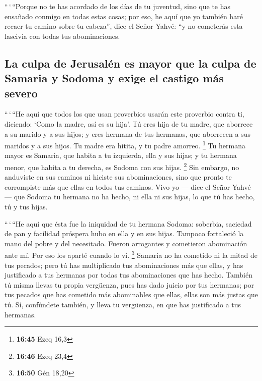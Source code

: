  ``\,`\,``Porque no te has acordado de los días de tu
juventud, sino que te has ensañado conmigo en todas estas cosas; por
eso, he aquí que yo también haré recaer tu camino sobre tu cabeza'',
dice el Señor Yahvé: ``y no cometerás esta lascivia con todas tus
abominaciones.

\hypertarget{la-culpa-de-jerusaluxe9n-es-mayor-que-la-culpa-de-samaria-y-sodoma-y-exige-el-castigo-muxe1s-severo}{%
\subsection{La culpa de Jerusalén es mayor que la culpa de Samaria y
Sodoma y exige el castigo más
severo}\label{la-culpa-de-jerusaluxe9n-es-mayor-que-la-culpa-de-samaria-y-sodoma-y-exige-el-castigo-muxe1s-severo}}

 ``\,`\,``He aquí que todos los que usan proverbios
usarán este proverbio contra ti, diciendo: `Como la madre, así es su
hija'.  Tú eres hija de tu madre, que aborrece a su
marido y a sus hijos; y eres hermana de tus hermanas, que aborrecen a
sus maridos y a sus hijos. Tu madre era hitita, y tu padre amorreo.
\footnote{\textbf{16:45} Ezeq 16,3}  Tu hermana mayor es
Samaria, que habita a tu izquierda, ella y sus hijas; y tu hermana
menor, que habita a tu derecha, es Sodoma con sus hijas. \footnote{\textbf{16:46}
  Ezeq 23,4}  Sin embargo, no anduviste en sus caminos ni
hiciste sus abominaciones, sino que pronto te corrompiste más que ellas
en todos tus caminos.  Vivo yo --- dice el Señor Yahvé
--- que Sodoma tu hermana no ha hecho, ni ella ni sus hijas, lo que tú
has hecho, tú y tus hijas.

 ``\,`\,``He aquí que ésta fue la iniquidad de tu hermana
Sodoma: soberbia, saciedad de pan y facilidad próspera hubo en ella y en
sus hijas. Tampoco fortaleció la mano del pobre y del necesitado.
 Fueron arrogantes y cometieron abominación ante mí. Por
eso los aparté cuando lo vi. \footnote{\textbf{16:50} Gén 18,20}
 Samaria no ha cometido ni la mitad de tus pecados; pero
tú has multiplicado tus abominaciones más que ellas, y has justificado a
tus hermanas por todas tus abominaciones que has hecho. 
También tú misma llevas tu propia vergüenza, pues has dado juicio por
tus hermanas; por tus pecados que has cometido más abominables que
ellas, ellas son más justas que tú. Sí, confúndete también, y lleva tu
vergüenza, en que has justificado a tus hermanas.

